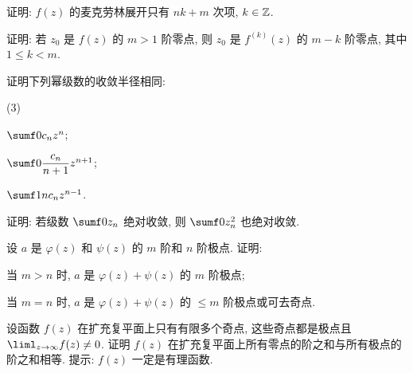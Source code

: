 \begin{homework}
\begin{homework}
      证明: $f(z)$ 的麦克劳林展开只有 $nk+m$ 次项, $k\in{\mathbb{Z}}$.
    \item 证明: 若 $z_0$ 是 $f(z)$ 的 $m>1$ 阶零点, 则 $z_0$ 是 $f^{(k)}(z)$ 的 $m-k$ 阶零点, 其中 $1\le k<m$.
    \item 证明下列幂级数的收敛半径相同:
      \begin{subhomework}(3)
        \item $\sumf0 c_nz^n$;
        \item $\sumf0 \dfrac{c_n}{n+1}z^{n+1}$;
        \item $\sumf1 nc_nz^{n-1}$.
      \end{subhomework}
    \item 证明: 若级数 $\sumf0 z_n$ 绝对收敛, 则 $\sumf0 z_n^2$ 也绝对收敛.
    \item 设 $a$ 是 $\varphi(z)$ 和 $\psi(z)$ 的 $m$ 阶和 $n$ 阶极点. 证明:
      \begin{subhomework}
        \item 当 $m>n$ 时, $a$ 是 $\varphi(z)+\psi(z)$ 的 $m$ 阶极点;
        \item 当 $m=n$ 时, $a$ 是 $\varphi(z)+\psi(z)$ 的 $\le m$ 阶极点或可去奇点.
      \end{subhomework}
    \item 设函数 $f(z)$ 在扩充复平面上只有有限多个奇点, 这些奇点都是极点且 $\liml_{z\ra\infty}f(z)\neq0$.
      证明 $f(z)$ 在扩充复平面上所有零点的阶之和与所有极点的阶之和相等. 提示: $f(z)$ 一定是有理函数.
  \end{homework}
\end{homework}

% 
% 
% 

